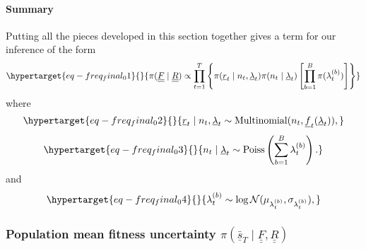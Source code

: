 \documentclass[
]{scrartcl}
\let\oldparagraph\paragraph
\renewcommand{\paragraph}[1]{\oldparagraph{#1}\mbox{}}
\begin{document}
\begin{refsegment}
{\paragraph{Summary}\label{summary}}

Putting all the pieces developed in this section together gives a term
for our inference of the form
\begin{equation}\protect\hypertarget{eq-freq_final_01}{}{
\pi(\underline{\underline{F}} \mid \underline{\underline{R}}) \propto
\prod_{t=1}^T\left\{
    \pi(\underline{r}_t \mid n_t, \underline{\lambda}_t)
    \pi(n_t \mid \underline{\lambda}_t)
    \left[ 
        \prod_{b=1}^B \pi(\lambda_t^{(b)})
    \right]
\right\}
}\label{eq-freq_final_01}\end{equation} where
\begin{equation}\protect\hypertarget{eq-freq_final_02}{}{
\underline{r}_t \mid n_t, \underline{\lambda}_t \sim
\operatorname{Multinomial}(n_t, \underline{f}_t(\underline{\lambda}_t)),
}\label{eq-freq_final_02}\end{equation}
\begin{equation}\protect\hypertarget{eq-freq_final_03}{}{
n_t \mid \underline{\lambda}_t \sim 
\operatorname{Poiss}\left(\sum_{b=1}^B \lambda_t^{(b)}\right).
}\label{eq-freq_final_03}\end{equation} and
\begin{equation}\protect\hypertarget{eq-freq_final_04}{}{
\lambda_t^{(b)} \sim 
\log\mathcal{N}(\mu_{\lambda_t^{(b)}}, \sigma_{\lambda_t^{(b)}}),
}\label{eq-freq_final_04}\end{equation}

\hypertarget{sec-bayes_meanfit}{%
\subsubsection{\texorpdfstring{Population mean fitness uncertainty
\(\pi(\underline{\bar{s}}_T \mid \underline{\underline{F}}, \underline{\underline{R}})\)}{Population mean fitness uncertainty \textbackslash pi(\textbackslash underline\{\textbackslash bar\{s\}\}\_T \textbackslash mid \textbackslash underline\{\textbackslash underline\{F\}\}, \textbackslash underline\{\textbackslash underline\{R\}\})}}\label{sec-bayes_meanfit}}


\end{refsegment}
\end{document}
